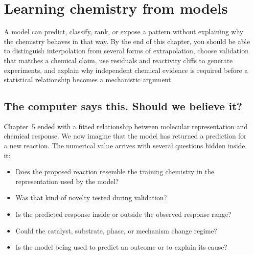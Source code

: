 
\chapter{Learning chemistry from models}

\begin{notebox}
  A model can predict, classify, rank, or expose a pattern without explaining why the chemistry behaves in that way.
  By the end of this chapter, you should be able to distinguish interpolation from several forms of extrapolation, choose validation that matches a chemical claim, use residuals and reactivity cliffs to generate experiments, and explain why independent chemical evidence is required before a statistical relationship becomes a mechanistic argument.
\end{notebox}

\section{The computer says this. Should we believe it?}

Chapter~5 ended with a fitted relationship between molecular representation and chemical response.
We now imagine that the model has returned a prediction for a new reaction.
The numerical value arrives with several questions hidden inside it:

\begin{itemize}
  \item Does the proposed reaction resemble the training chemistry in the representation used by the model?
  \item Was that kind of novelty tested during validation?
  \item Is the predicted response inside or outside the observed response range?
  \item Could the catalyst, substrate, phase, or mechanism change regime?
  \item Is the model being used to predict an outcome or to explain its cause?
\end{itemize}


